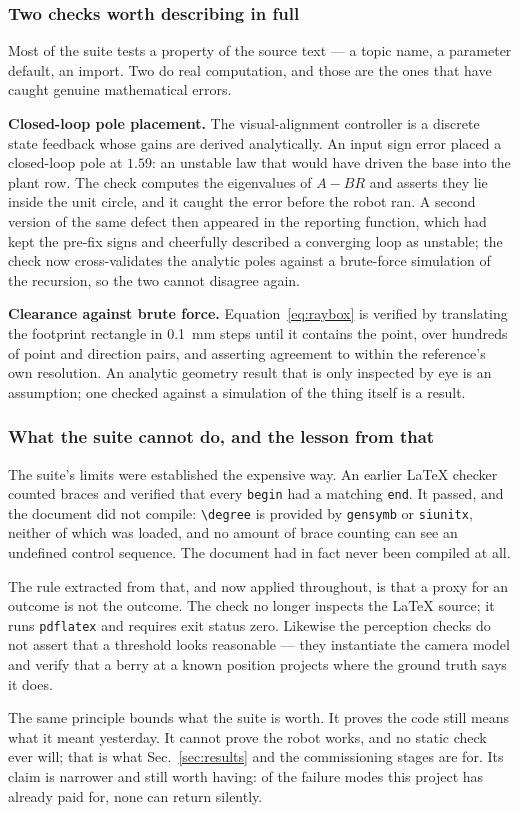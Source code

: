 \subsubsection{Two checks worth describing in full}

Most of the suite tests a property of the source text --- a topic name, a
parameter default, an import. Two do real computation, and those are the ones
that have caught genuine mathematical errors.

\textbf{Closed-loop pole placement.} The visual-alignment controller is a
discrete state feedback whose gains are derived analytically. An input sign
error placed a closed-loop pole at $1.59$: an unstable law that would have
driven the base into the plant row. The check computes the eigenvalues of
$A - BR$ and asserts they lie inside the unit circle, and it caught the error
before the robot ran. A second version of the same defect then appeared in
the reporting function, which had kept the pre-fix signs and cheerfully
described a converging loop as unstable; the check now cross-validates the
analytic poles against a brute-force simulation of the recursion, so the two
cannot disagree again.

\textbf{Clearance against brute force.} Equation~\eqref{eq:raybox} is
verified by translating the footprint rectangle in \SI{0.1}{mm} steps until
it contains the point, over hundreds of point and direction pairs, and
asserting agreement to within the reference's own resolution. An analytic
geometry result that is only inspected by eye is an assumption; one checked
against a simulation of the thing itself is a result.

\subsubsection{What the suite cannot do, and the lesson from that}

The suite's limits were established the expensive way. An earlier
\LaTeX{} checker counted braces and verified that every \texttt{begin} had a
matching \texttt{end}. It passed, and the document did not compile:
\verb|\degree| is provided by \texttt{gensymb} or \texttt{siunitx}, neither
of which was loaded, and no amount of brace counting can see an undefined
control sequence. The document had in fact never been compiled at all.

The rule extracted from that, and now applied throughout, is that a proxy for
an outcome is not the outcome. The check no longer inspects the \LaTeX{}
source; it runs \texttt{pdflatex} and requires exit status zero. Likewise the
perception checks do not assert that a threshold looks reasonable --- they
instantiate the camera model and verify that a berry at a known position
projects where the ground truth says it does.

The same principle bounds what the suite is worth. It proves the code still
means what it meant yesterday. It cannot prove the robot works, and no static
check ever will; that is what Sec.~\ref{sec:results} and the commissioning
stages are for. Its claim is narrower and still worth having: of the failure
modes this project has already paid for, none can return silently.
